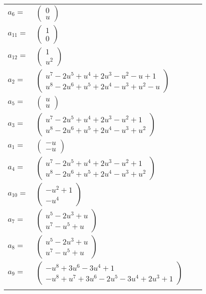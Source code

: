 \documentclass[1p]{elsarticle_modified}
\theoremstyle{definition}
\begin{document}
\begin{tabular}{m{7pt} m{180pt} m{7pt} m{180pt} }
\flushright $a_{6}=$&$\begin{pmatrix}0\\u\end{pmatrix}$ \\
\flushright $a_{11}=$&$\begin{pmatrix}1\\0\end{pmatrix}$ \\
\flushright $a_{12}=$&$\begin{pmatrix}1\\u^2\end{pmatrix}$ \\
\flushright $a_{2}=$&$\begin{pmatrix}u^7-2 u^5+u^4+2 u^3- u^2- u+1\\u^8-2 u^6+u^5+2 u^4- u^3+u^2- u\end{pmatrix}$ \\
\flushright $a_{5}=$&$\begin{pmatrix}u\\u\end{pmatrix}$ \\
\flushright $a_{3}=$&$\begin{pmatrix}u^7-2 u^5+u^4+2 u^3- u^2+1\\u^8-2 u^6+u^5+2 u^4- u^3+u^2\end{pmatrix}$ \\
\flushright $a_{1}=$&$\begin{pmatrix}- u\\- u\end{pmatrix}$ \\
\flushright $a_{4}=$&$\begin{pmatrix}u^7-2 u^5+u^4+2 u^3- u^2+1\\u^8-2 u^6+u^5+2 u^4- u^3+u^2\end{pmatrix}$ \\
\flushright $a_{10}=$&$\begin{pmatrix}- u^2+1\\- u^4\end{pmatrix}$ \\
\flushright $a_{7}=$&$\begin{pmatrix}u^5-2 u^3+u\\u^7- u^5+u\end{pmatrix}$ \\
\flushright $a_{8}=$&$\begin{pmatrix}u^5-2 u^3+u\\u^7- u^5+u\end{pmatrix}$ \\
\flushright $a_{9}=$&$\begin{pmatrix}- u^8+3 u^6-3 u^4+1\\- u^8+u^7+3 u^6-2 u^5-3 u^4+2 u^3+1\end{pmatrix}$\\&\end{tabular}
\end{document}
